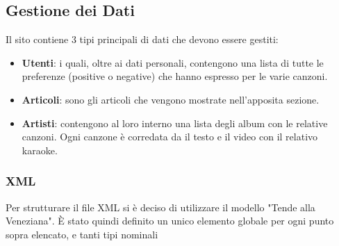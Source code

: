 \subsection{Gestione dei Dati}
Il sito contiene 3 tipi principali di dati che devono essere gestiti:
\begin{itemize}
\item \textbf{Utenti}: i quali, oltre ai dati personali, contengono una lista di tutte le preferenze (positive o negative) che hanno espresso per le varie canzoni.
\item \textbf{Articoli}: sono gli articoli che vengono mostrate nell'apposita sezione.
\item \textbf{Artisti}: contengono al loro interno una lista degli album con le relative canzoni. Ogni canzone \`e corredata da il testo e il video con il relativo karaoke.
\end{itemize}

\subsubsection{XML}
Per strutturare il file XML si \`e deciso di utilizzare il modello "Tende alla Veneziana".  \`E stato quindi definito un unico elemento globale per ogni punto sopra elencato, e tanti tipi nominali

